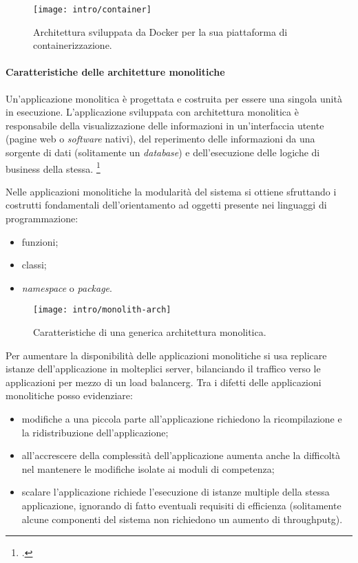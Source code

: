 \begin{figure}[H]
    \centering
    \texttt{[image: intro/container]}
    \caption{Architettura sviluppata da Docker per la sua piattaforma di containerizzazione.\\ \cite{site:docker-container}}
    \label{fig:docker-arch}
\end{figure}

\paragraph{Caratteristiche delle architetture monolitiche}

Un'applicazione monolitica è progettata e costruita per essere una singola unità in esecuzione.
L'applicazione sviluppata con architettura monolitica è responsabile della visualizzazione delle informazioni in un'interfaccia utente (pagine web o \emph{software} nativi), del reperimento delle informazioni da una sorgente di dati (solitamente un \emph{database}) e dell'esecuzione delle logiche di business della stessa.
\footcite{book:beginning-sw-eng}

Nelle applicazioni monolitiche la modularità del sistema si ottiene sfruttando i costrutti fondamentali dell'orientamento ad oggetti presente nei linguaggi di programmazione:
\begin{itemize}
  \item funzioni;
  \item classi;
  \item \emph{namespace} o \emph{package}.
\end{itemize}

\begin{figure}[H]
    \centering
    \texttt{[image: intro/monolith-arch]}
    \caption{Caratteristiche di una generica architettura monolitica.\\ \cite{site:fowler-microservices}}
    \label{fig:monolith-arch}
\end{figure}

Per aumentare la disponibilità delle applicazioni monolitiche si usa replicare istanze dell'applicazione in molteplici server, bilanciando il traffico verso le applicazioni per mezzo di un \gls{load balancerg}.
Tra i difetti delle applicazioni monolitiche posso evidenziare:
\begin{itemize}
  \item modifiche a una piccola parte all'applicazione richiedono la ricompilazione e la ridistribuzione dell'applicazione;
  \item all'accrescere della complessità dell'applicazione aumenta anche la difficoltà nel mantenere le modifiche isolate ai moduli di competenza;
  \item scalare l'applicazione richiede l'esecuzione di istanze multiple della stessa applicazione, ignorando di fatto eventuali requisiti di efficienza (solitamente alcune componenti del sistema non richiedono un aumento di \gls{throughputg}).
\end{itemize}

